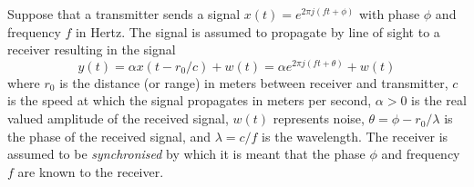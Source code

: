 \documentclass[10pt,twocolumn,twoside]{IEEEtran}
\begin{document}
Suppose that a transmitter sends a signal $x(t) = e^{2\pi j(ft + \phi)}$ with phase $\phi$ and frequency $f$ in Hertz.  The signal is assumed to propagate by line of sight to a receiver resulting in the signal 
\[
y(t) = \alpha x(t - r_0/c) + w(t) = \alpha e^{2\pi j(ft + \theta)} + w(t)
\]
where $r_0$ is the distance (or range) in meters between receiver and transmitter, $c$ is the speed at which the signal propagates in meters per second, $\alpha > 0$ is the real valued amplitude of the received signal, $w(t)$ represents noise, $\theta = \phi - r_0/\lambda$ is the phase of the received signal, and $\lambda = c/f$ is the wavelength.  The receiver is assumed to be \emph{synchronised} by which it is meant that the phase $\phi$ and frequency $f$ are known to the receiver.  
\end{document}
